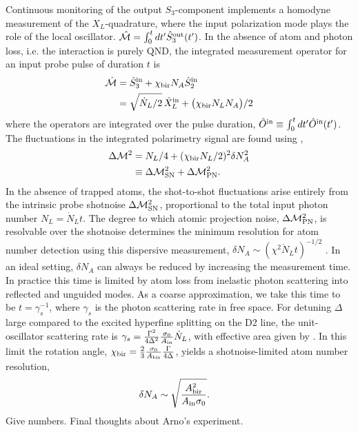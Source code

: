 \documentclass[preprint,aps,pra,onecolumn]{revtex4-1} %
\newcommand{\chibir}{\chi_{\rm bir}}
\newcommand{\shotnoise}{\Delta \mathcal{M}^2_{\rm SN}}
\newcommand{\projnoise}{\Delta \mathcal{M}^2_{\rm PN}}
\newcommand{\Abiref}{A_{\rm bir}}
\newcommand{\comment}[1]{{\color{Maroon} #1}}
\begin{document}
Continuous monitoring of the output $S_3$-component implements a homodyne measurement of the $X_L$-quadrature, where the input polarization mode plays the role of the local oscillator.  $\hat{\mathcal{M}} = \int_0^t dt' \hat{S}^{\rm out}_3(t')$. In the absence of atom and photon loss, i.e. the interaction is purely QND, the integrated measurement operator for an input probe pulse of duration $t$ is \cite{vasilyev_quantum_2012}
	\begin{align} \label{Eq::OutputS3}
		\hat{\mathcal{M}} & = \hat{S}^{\rm in}_3 + \chibir N_A \hat{S}^{\rm in}_2 \\
		& = \sqrt{\dot{N}_L/2} \, \hat{X}_L^{\rm in} + \big( \chibir N_L N_A \big)/2 
	\end{align}
where the operators are integrated over the pulse duration, $\hat{O}^{\rm in} \equiv \int_0^t dt' \hat{O}^{\rm in}(t')$. The fluctuations in the integrated polarimetry signal are found using , 
	\begin{align}
		\Delta \mathcal{M}^2 &= N_L /4 + ( \chibir N_L /2 )^2 \delta N_A^2\label{Eq::MeasurementVariance}\\
			&\equiv \shotnoise + \projnoise.
	\end{align}
In the absence of trapped atoms, the shot-to-shot fluctuations arise entirely from the intrinsic probe shotnoise $\shotnoise$, proportional to the total input photon number $N_L = \dot{N}_Lt$. The degree to which atomic projection noise, $\projnoise$, is resolvable over the shotnoise determines the minimum resolution for atom number detection using this dispersive measurement, $\delta N_A \sim ( \chi^2 \dot{N}_L t )^{-1/2}$ \cite{smith_faraday_2003}.  In an ideal setting, $\delta N_A$ can always be reduced by increasing the measurement time. In practice this time is limited by atom loss from inelastic photon scattering into reflected and unguided modes. As a coarse approximation, we take this time to be $t=\gamma_s^{-1}$, where $\gamma_s$ is the photon scattering rate in free space.  For detuning $\Delta$ large compared to the excited hyperfine splitting on the D2 line, the unit-oscillator scattering rate is $\gamma_s = \frac{\Gamma^2}{4 \Delta^2}\frac{\sigma_0 }{A_{\rm in}} \dot{N}_L $, with effective area given by .  In this limit the rotation angle, $\chibir = \frac{2}{3} \frac{\sigma_0}{\Abiref}\frac{\Gamma}{4\Delta}$, yields a shotnoise-limited atom number resolution, 
	\begin{align} \label{Eq::AtomNumberResolution}
		\delta N_A  &\sim \sqrt {\frac{\Abiref^2}{A_{\rm in} \sigma_0}}.
	\end{align}
\comment{Give numbers. Final thoughts about Arno's experiment.} 
\end{document}
